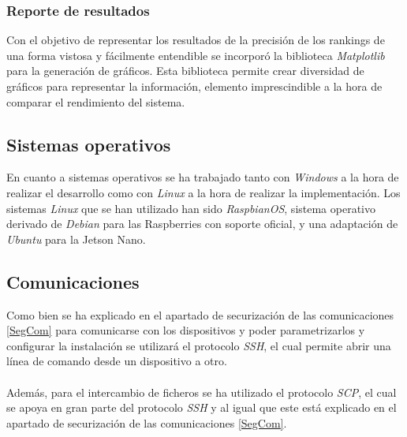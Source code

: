 \subsubsection{Reporte de resultados}
Con el objetivo de representar los resultados de la precisión de los rankings de una forma vistosa y fácilmente entendible se incorporó la biblioteca \textit{Matplotlib} para la generación de gráficos. Esta biblioteca permite crear diversidad de gráficos para representar la información, elemento imprescindible a la hora de comparar el rendimiento del sistema.

\subsection{Sistemas operativos}
En cuanto a sistemas operativos se ha trabajado tanto con \textit{Windows} a la hora de realizar el desarrollo como con \textit{Linux} a la hora de realizar la implementación. Los sistemas \textit{Linux} que se han utilizado han sido \textit{RaspbianOS}, sistema operativo derivado de \textit{Debian} para las Raspberries con soporte oficial, y una adaptación de \textit{Ubuntu} para la Jetson Nano.
\subsection{Comunicaciones}
Como bien se ha explicado en el apartado de securización de las comunicaciones \ref{SegCom} para comunicarse con los dispositivos y poder parametrizarlos y configurar la instalación se utilizará el protocolo \textit{SSH}, el cual permite abrir una línea de comando desde un dispositivo a otro.
\\ \\
Además, para el intercambio de ficheros se ha utilizado el protocolo \textit{SCP}, el cual se apoya en gran parte del protocolo \textit{SSH} y al igual que este está explicado en el apartado de securización de las comunicaciones \ref{SegCom}.